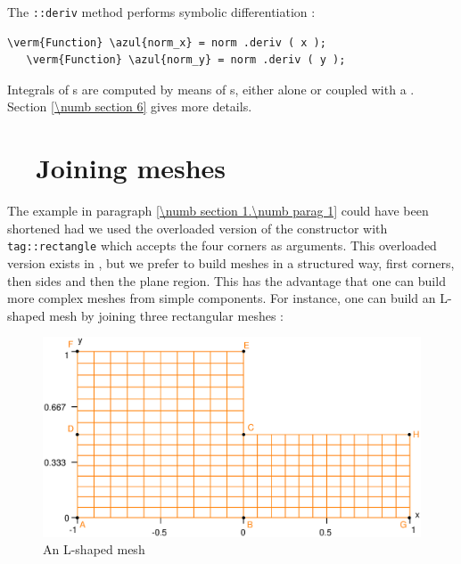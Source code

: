 The {\small\tt{}::deriv} method performs symbolic differentiation :

\begin{Verbatim}[commandchars=\\\{\},formatcom=\small\tt,baselinestretch=0.94]
   \verm{Function} \azul{norm_x} = norm .deriv ( x );
   \verm{Function} \azul{norm_y} = norm .deriv ( y );
\end{Verbatim}

Integrals of {\small\tt{}}s are computed by means of {\small\tt{}}s,
either alone or coupled with a {\small\tt{}}.
Section \ref{\numb section 6} gives more details.
\vfil\eject


\section{~~Joining meshes}\label{\numb section 1.\numb parag 4}

The example in paragraph \ref{\numb section 1.\numb parag 1} could have been shortened
had we used the overloaded version of the {\small\tt {}} constructor with
{\small\tt \textcolor{tag}{tag}::rectangle} which accepts the four corners as arguments. 
This overloaded version exists in \maniFEM, but we prefer to build meshes in a structured way, 
first corners, then sides and then the plane region. 
This has the advantage that one can build more complex meshes from simple components. 
For instance, one can build an L-shaped mesh by joining three rectangular meshes :

\begin{figure}[ht] \centering
  \includegraphics[width=115mm]{L-shaped}
  \caption{An L-shaped mesh}
  \label{\numb section 1.\numb fig 5}
\end{figure}

